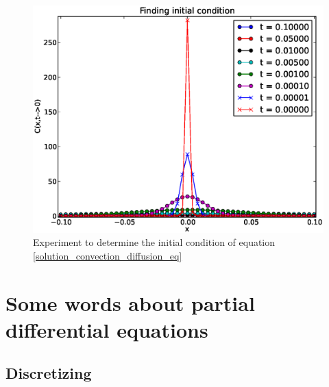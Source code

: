 \begin{figure}[H]
 \centering
 \includegraphics[scale=0.7]{Figures/convection_diffusion_eq_initial_condition.eps}
 \caption[Initial condition for convection diffusion]{Experiment to determine the initial condition of equation \ref{solution_convection_diffusion_eq}}
 \label{convection_diffusion_eq_initial_condition}
\end{figure}


\section{Some words about partial differential equations}\label{some_words_on_PDEs}
\subsection{Discretizing}\label{discretizing}


